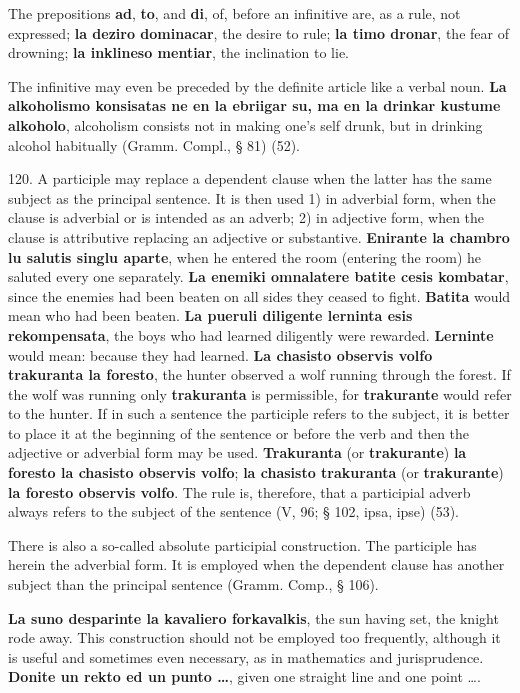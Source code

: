 The prepositions \textbf{ad}, \textbf{to}, and \textbf{di}, of, before an infinitive are, as a rule, not expressed; \textbf{la deziro dominacar}, the desire to rule; \textbf{la timo dronar}, the fear of drowning; \textbf{la inklineso mentiar}, the inclination to lie.

The infinitive may even be preceded by the definite article like a verbal noun. \textbf{La alkoholismo konsisatas ne en la ebriigar su, ma en la drinkar kustume alkoholo}, alcoholism consists not in making one's self drunk, but in drinking alcohol habitually (Gramm. Compl., § 81) (52).

120. A participle may replace a dependent clause when the latter has the same subject as the principal sentence. It is then used 1) in adverbial form, when the clause is adverbial or is intended as an adverb; 2) in adjective form, when the clause is attributive replacing an adjective or substantive. \textbf{Enirante la chambro lu salutis singlu aparte}, when he entered the room (entering the room) he saluted every one separately. \textbf{La enemiki omnalatere batite cesis kombatar}, since the enemies had been beaten on all sides they ceased to fight. \textbf{Batita} would mean who had been beaten. \textbf{La pueruli diligente lerninta esis rekompensata}, the boys who had learned diligently were rewarded. \textbf{Lerninte} would mean: because they had learned. \textbf{La chasisto observis volfo trakuranta la foresto}, the hunter observed a wolf running through the forest. If the wolf was running only \textbf{trakuranta} is permissible, for \textbf{trakurante} would refer to the hunter. If in such a sentence the participle refers to the subject, it is better to place it at the beginning of the sentence or before the verb and then the adjective or adverbial form may be used. \textbf{Trakuranta }(or \textbf{trakurante})\textbf{ la foresto la chasisto observis volfo}; \textbf{la chasisto trakuranta }(or \textbf{trakurante})\textbf{ la foresto observis volfo}. The rule is, therefore, that a participial adverb always refers to the subject of the sentence (V, 96; § 102, ipsa, ipse) (53).

There is also a so-called absolute participial construction. The participle has herein the adverbial form. It is employed when the dependent clause has another subject than the principal sentence (Gramm. Comp., § 106).

\textbf{La suno desparinte la kavaliero forkavalkis}, the sun having set, the knight rode away. This construction should not be employed too frequently, although it is useful and sometimes even necessary, as in mathematics and jurisprudence. \textbf{Donite un rekto ed un punto \ldots}, given one straight line and one point \ldots .

